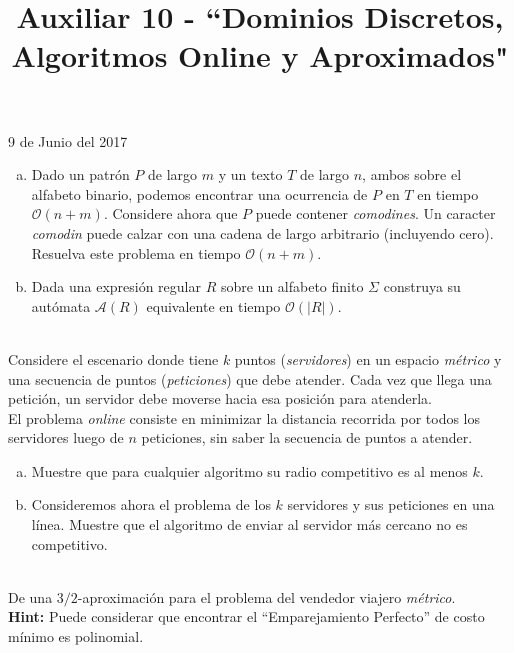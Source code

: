 \documentclass[dcc,uchile]{fcfmcourse}
\title{Auxiliar 10 - ``Dominios Discretos, Algoritmos Online y Aproximados"}
\begin{document}
\maketitle
\begin{center}
9 de Junio del 2017
\end{center}
\vspace{-1ex}


\begin{problems}
\begin{enumerate}[a)]
    \item Dado un patrón $P$ de largo $m$ y un texto $T$ de largo $n$, ambos sobre el alfabeto binario, podemos encontrar una ocurrencia de $P$ en $T$ en tiempo $\mathcal{O}(n+m)$. Considere ahora que $P$ puede contener \textit{comodines}. Un caracter \textit{comodin} puede calzar con una cadena de largo arbitrario (incluyendo cero). Resuelva este problema en tiempo $\mathcal{O}(n+m)$.
    \item Dada una expresión regular $R$ sobre un alfabeto finito $\Sigma$ construya su autómata $\mathcal{A}(R)$ equivalente en tiempo $\mathcal{O}(|R|)$.
\end{enumerate}

\\
Considere el escenario donde tiene $k$ puntos (\textit{servidores}) en un espacio \textit{métrico} y una secuencia de puntos (\textit{peticiones}) que debe atender. Cada vez que llega una petición, un servidor debe moverse hacia esa posición para atenderla.\\
El problema \textit{online} consiste en minimizar la distancia recorrida por todos los servidores luego de $n$ peticiones, sin saber la secuencia de puntos a atender.
\begin{enumerate}[a)]
    \item Muestre que para cualquier algoritmo su radio competitivo es al menos $k$.   
    \item Consideremos ahora el problema de los $k$ servidores y sus peticiones en una línea. Muestre que el algoritmo de enviar al servidor más cercano no es competitivo.
\end{enumerate}

\\
De una $3/2$-aproximación para el problema del vendedor viajero \textit{métrico}.\\
\textbf{Hint:} Puede considerar que encontrar el ``Emparejamiento Perfecto'' de costo mínimo es polinomial.
\end{problems}
\end{document}
